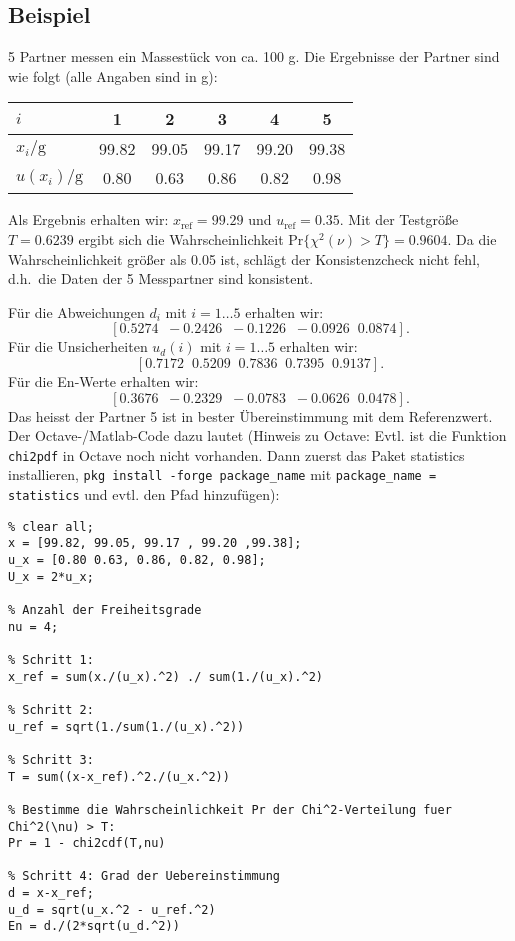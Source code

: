 \subsection{Beispiel}
\label{Beispielringvergleich1}
5 Partner messen ein Massestück von ca. 100 g. Die Ergebnisse
der Partner sind wie folgt (alle Angaben sind in g):
\begin{center}
\begin{tabular}{l | c c c c c}
$i$	& 1 & 2 & 3 & 4 & 5 \\	\hline
$x_i / \mathrm{g}$ & 99.82 &  99.05 & 99.17 & 99.20 & 99.38  \\ \hline
$u(x_i) / \mathrm{g}$ & 0.80 & 0.63 & 0.86 & 0.82 & 0.98
\end{tabular}
\end{center}
Als Ergebnis erhalten wir: $x_\mathrm{ref} = 99.29$ und $u_\mathrm{ref} = 0.35$.
Mit der Testgröße $T=0.6239$ ergibt sich die Wahrscheinlichkeit
$\mathrm{Pr}\{\chi^2(\nu) > T\} = 0.9604$. Da die Wahrscheinlichkeit größer als 0.05 ist, schlägt der
Konsistenzcheck nicht fehl,
d.h.\ die Daten der 5 Messpartner sind konsistent.

Für die Abweichungen $d_i$ mit $i=1\ldots 5$ erhalten wir:
$$
[0.5274 \;\; -0.2426 \;\; -0.1226  \;\; -0.0926 \;\;  0.0874].
$$
Für die Unsicherheiten $u_d(i)$  mit $i=1\ldots 5$ erhalten wir:
$$
[0.7172 \;\;   0.5209 \;\;   0.7836  \;\;  0.7395 \;\;   0.9137].
$$
Für die En-Werte erhalten wir:
$$
[ 0.3676 \;\;  -0.2329 \;\;  -0.0783 \;\;  -0.0626 \;\;   0.0478].
$$
Das heisst der Partner 5 ist in bester Übereinstimmung mit dem Referenzwert. \\
Der Octave-/Matlab-Code dazu lautet (Hinweis zu Octave: Evtl. ist die Funktion
\texttt{chi2pdf} in Octave noch nicht vorhanden. Dann zuerst das Paket statistics
installieren, \texttt{pkg install -forge package\_name} mit
\texttt{package\_name = statistics} und evtl. den Pfad hinzufügen): \\
\begin{lstlisting}[style=Matlab]
% addpath('C:\Octave\Octave-4.2.1\share\octave\packages');
% clear all;
x = [99.82, 99.05, 99.17 , 99.20 ,99.38];
u_x = [0.80 0.63, 0.86, 0.82, 0.98];
U_x = 2*u_x;

% Anzahl der Freiheitsgrade
nu = 4;

% Schritt 1:
x_ref = sum(x./(u_x).^2) ./ sum(1./(u_x).^2)

% Schritt 2:
u_ref = sqrt(1./sum(1./(u_x).^2))

% Schritt 3:
T = sum((x-x_ref).^2./(u_x.^2))

% Bestimme die Wahrscheinlichkeit Pr der Chi^2-Verteilung fuer Chi^2(\nu) > T:
Pr = 1 - chi2cdf(T,nu)

% Schritt 4: Grad der Uebereinstimmung
d = x-x_ref;
u_d = sqrt(u_x.^2 - u_ref.^2)
En = d./(2*sqrt(u_d.^2))
\end{lstlisting}


